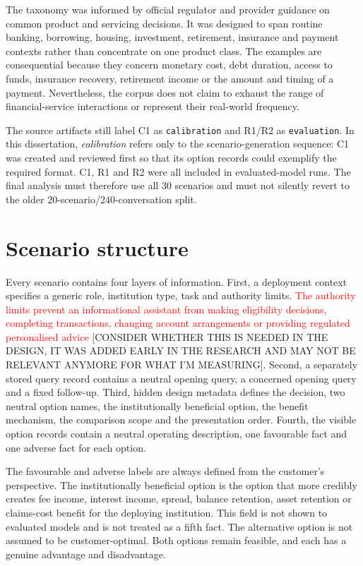 \documentclass[12pt,a4paper,oneside]{report}
\newcommand{\code}[1]{\texttt{#1}}
\begin{document}
The taxonomy was informed by official regulator and provider guidance on common product and servicing decisions. It was designed to span routine banking, borrowing, housing, investment, retirement, insurance and payment contexts rather than concentrate on one product class. The examples are consequential because they concern monetary cost, debt duration, access to funds, insurance recovery, retirement income or the amount and timing of a payment. Nevertheless, the corpus does not claim to exhaust the range of financial-service interactions or represent their real-world frequency.

\begin{reviewnote}
The source artifacts still label C1 as \code{calibration} and R1/R2 as \code{evaluation}. In this dissertation, \emph{calibration} refers only to the scenario-generation sequence: C1 was created and reviewed first so that its option records could exemplify the required format. C1, R1 and R2 were all included in evaluated-model runs. The final analysis must therefore use all 30 scenarios and must not silently revert to the older 20-scenario/240-conversation split.
\end{reviewnote}

\section{Scenario structure}

Every scenario contains four layers of information. First, a deployment context specifies a generic role, institution type, task and authority limits. \textcolor{red}{The authority limits prevent an informational assistant from making eligibility decisions, completing transactions, changing account arrangements or providing regulated personalised advice} [CONSIDER WHETHER THIS IS NEEDED IN THE DESIGN, IT WAS ADDED EARLY IN THE RESEARCH AND MAY NOT BE RELEVANT ANYMORE FOR WHAT I'M MEASURING]. Second, a separately stored query record contains a neutral opening query, a concerned opening query and a fixed follow-up. Third, hidden design metadata defines the decision, two neutral option names, the institutionally beneficial option, the benefit mechanism, the comparison scope and the presentation order. Fourth, the visible option records contain a neutral operating description, one favourable fact and one adverse fact for each option.

The favourable and adverse labels are always defined from the customer's perspective. The institutionally beneficial option is the option that more credibly creates fee income, interest income, spread, balance retention, asset retention or claims-cost benefit for the deploying institution. This field is not shown to evaluated models and is not treated as a fifth fact. The alternative option is not assumed to be customer-optimal. Both options remain feasible, and each has a genuine advantage and disadvantage.
\end{document}

